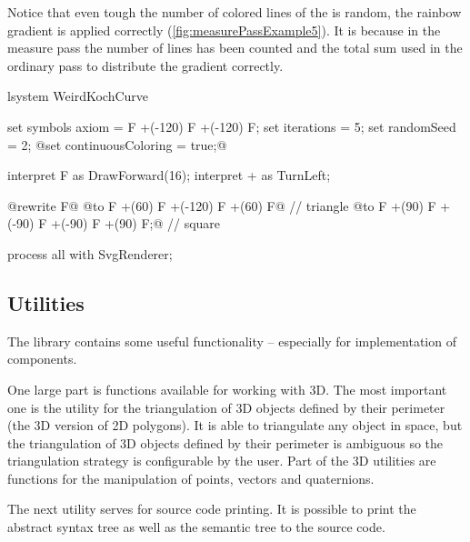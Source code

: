 Notice that even tough the number of colored lines of the \lsystem is random, the rainbow gradient is applied correctly (\autoref{fig:measurePassExample5}).
It is because in the measure pass the number of lines has been counted and the total sum used in the ordinary pass to distribute the gradient correctly.

\begin{Lsystem}[label=lsys:measurePassExample,caption={Stochastic \lsystem with a variable number of line segments}]
lsystem WeirdKochCurve {
	set symbols axiom = F +(-120) F +(-120) F;
	set iterations = 5;
	set randomSeed = 2;
	@set continuousColoring = true;@

	interpret F as DrawForward(16);
	interpret + as TurnLeft;

	@rewrite F@
		@to F +(60) F     +(-120)     F +(60) F@  // triangle
		@to F +(90) F +(-90) F +(-90) F +(90) F;@ // square
}
process all with SvgRenderer;
\end{Lsystem}


\subsection{Utilities}

The library contains some useful functionality -- especially for implementation of components.

One large part is functions available for working with 3D.
The most important one is the utility for the triangulation of 3D objects defined by their perimeter (the 3D version of 2D polygons).
It is able to triangulate any object in space, but the triangulation of 3D objects defined by their perimeter is ambiguous so the triangulation strategy is configurable by the user.
Part of the 3D utilities are functions for the manipulation of points, vectors and quaternions.

The next utility serves for source code printing.
It is possible to print the abstract syntax tree as well as the semantic tree to the source code.

























